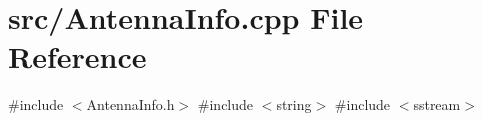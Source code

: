 \section{src/\+Antenna\+Info.cpp File Reference}
\label{_antenna_info_8cpp}
{\ttfamily \#include $<$Antenna\+Info.\+h$>$}\newline
{\ttfamily \#include $<$string$>$}\newline
{\ttfamily \#include $<$sstream$>$}\newline
